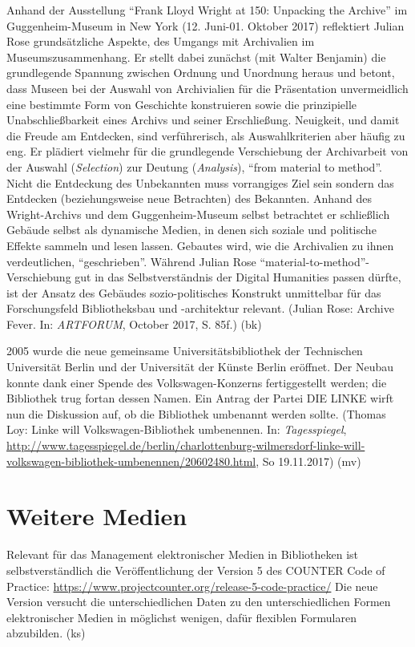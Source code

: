 \documentclass[a4paper,
fontsize=11pt,
oneside,
numbers=noperiodatend,
parskip=half-,
bibliography=totoc,
final
]{scrartcl}
\begin{document}
Anhand der Ausstellung \enquote{Frank Lloyd Wright at 150: Unpacking the
Archive} im Guggenheim-Museum in New York (12. Juni-01. Oktober 2017)
reflektiert Julian Rose grundsätzliche Aspekte, des Umgangs mit
Archivalien im Museumszusammenhang. Er stellt dabei zunächst (mit Walter
Benjamin) die grundlegende Spannung zwischen Ordnung und Unordnung
heraus und betont, dass Museen bei der Auswahl von Archivialien für die
Präsentation unvermeidlich eine bestimmte Form von Geschichte
konstruieren sowie die prinzipielle Unabschließbarkeit eines Archivs und
seiner Erschließung. Neuigkeit, und damit die Freude am Entdecken, sind
verführerisch, als Auswahlkriterien aber häufig zu eng. Er plädiert
vielmehr für die grundlegende Verschiebung der Archivarbeit von der
Auswahl (\emph{Selection}) zur Deutung (\emph{Analysis}), \enquote{from
material to method}. Nicht die Entdeckung des Unbekannten muss
vorrangiges Ziel sein sondern das Entdecken (beziehungsweise neue
Betrachten) des Bekannten. Anhand des Wright-Archivs und dem
Guggenheim-Museum selbst betrachtet er schließlich Gebäude selbst als
dynamische Medien, in denen sich soziale und politische Effekte sammeln
und lesen lassen. Gebautes wird, wie die Archivalien zu ihnen
verdeutlichen, \enquote{geschrieben}. Während Julian Rose
\enquote{material-to-method}-Verschiebung gut in das Selbstverständnis
der Digital Humanities passen dürfte, ist der Ansatz des Gebäudes
sozio-politisches Konstrukt unmittelbar für das Forschungsfeld
Bibliotheksbau und -architektur relevant. (Julian Rose: Archive Fever.
In: \emph{ARTFORUM}, October 2017, S. 85f.) (bk)

2005 wurde die neue gemeinsame Universitätsbibliothek der Technischen
Universität Berlin und der Universität der Künste Berlin eröffnet. Der
Neubau konnte dank einer Spende des Volkswagen-Konzerns fertiggestellt
werden; die Bibliothek trug fortan dessen Namen. Ein Antrag der Partei
DIE LINKE wirft nun die Diskussion auf, ob die Bibliothek umbenannt
werden sollte. (Thomas Loy: Linke will Volkswagen-Bibliothek umbenennen.
In: \emph{Tagesspiegel},
\url{http://www.tagesspiegel.de/berlin/charlottenburg-wilmersdorf-linke-will-volkswagen-bibliothek-umbenennen/20602480.html},
So 19.11.2017) (mv)

\hypertarget{weitere-medien}{%
\section*{Weitere Medien}\label{weitere-medien}}

Relevant für das Management elektronischer Medien in Bibliotheken ist
selbstverständlich die Veröffentlichung der Version 5 des COUNTER Code
of Practice:
\url{https://www.projectcounter.org/release-5-code-practice/} Die neue
Version versucht die unterschiedlichen Daten zu den unterschiedlichen
Formen elektronischer Medien in möglichst wenigen, dafür flexiblen
Formularen abzubilden. (ks)
\end{document}
